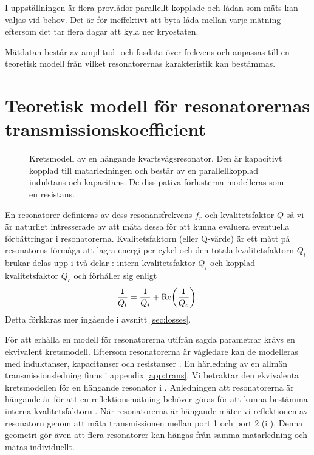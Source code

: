 \documentclass[main.tex]{subfiles}
\begin{document}
I uppställningen är flera provlådor parallellt kopplade och lådan som mäts kan väljas vid behov. Det är för ineffektivt att byta låda mellan varje mätning eftersom det tar flera dagar att kyla ner kryostaten.

Mätdatan består av amplitud- och fasdata över frekvens och anpassas till en teoretisk modell från vilket resonatorernas karakteristik kan bestämmas.

\section{Teoretisk modell för resonatorernas transmissionskoefficient}
\label{sec:res_teori}

\begin{figure}
\centering
{}
\begin{circuitikz}[line width=1pt,scale=0.7]

\end{circuitikz}
\caption{Kretsmodell av en hängande kvartsvågsresonator. Den är kapacitivt kopplad till matarledningen och består av en parallellkopplad induktans och kapacitans. De dissipativa förlusterna modelleras som en resistans.}
\label{fig:ekviv_krets}
\end{figure}
En resonatorer definieras av dess resonansfrekvens $f_r$ och kvalitetsfaktor $Q$ \cite[s. 3]{Boehme2016} så vi är naturligt intresserade av att mäta dessa för att kunna evaluera eventuella förbättringar i resonatorerna. Kvalitetsfaktorn (eller Q-värde) är ett mått på resonatorns förmåga att lagra energi per cykel och den totala kvalitetsfaktorn $Q_l$ brukar delas upp i två delar \cite{Probst2015}: intern kvalitetsfaktor $Q_i$ och kopplad kvalitetsfaktor $Q_c$ och förhåller sig enligt 
\begin{equation}
\frac{1}{Q_l}=\frac{1}{Q_i}+\text{Re}\qty(\frac{1}{Q_c}).
\end{equation}
Detta förklaras mer ingående i avsnitt \ref{sec:losses}.

För att erhålla en modell för resonatorerna utifrån sagda parametrar krävs en ekvivalent kretsmodell. Eftersom resonatorerna är vågledare kan de modelleras med induktanser, kapacitanser och resistanser \cite[s. 437]{cheng}. En härledning av en allmän transmissionsledning finns i appendix \ref{app:trans}. Vi betraktar den ekvivalenta kretsmodellen för en hängande resonator \cite{Boehme2016} i . Anledningen att resonatorerna är hängande är för att en reflektionsmätning behöver göras för att kunna bestämma interna kvalitetsfaktorn \cite{Probst2015}. När resonatorerna är hängande mäter vi reflektionen av resonatorn genom att mäta transmissionen mellan port 1 och port 2 (i ). Denna geometri gör även att flera resonatorer kan hängas från samma matarledning och mätas individuellt.
\end{document}
